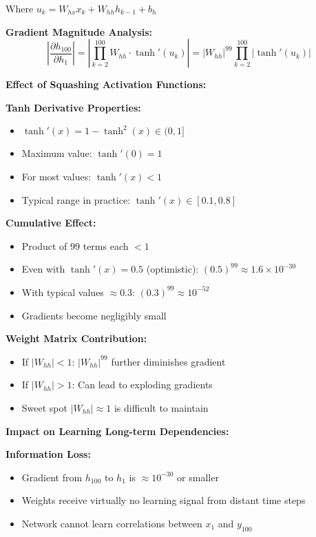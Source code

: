 \documentclass[12pt]{article}
\begin{document}
\begin{enumerate}[(a)]
{    Where $u_k = W_{hx} x_k + W_{hh} h_{k-1} + b_h$
    
    \textbf{Gradient Magnitude Analysis:}
    $$\left|\frac{\partial h_{100}}{\partial h_1}\right| = \left|\prod_{k=2}^{100} W_{hh} \cdot \tanh'(u_k)\right| = |W_{hh}|^{99} \prod_{k=2}^{100} |\tanh'(u_k)|$$
    
    \textbf{Effect of Squashing Activation Functions:}
    
    \textbf{Tanh Derivative Properties:}
    \begin{itemize}
        \item $\tanh'(x) = 1 - \tanh^2(x) \in (0, 1]$
        \item Maximum value: $\tanh'(0) = 1$
        \item For most values: $\tanh'(x) < 1$
        \item Typical range in practice: $\tanh'(x) \in [0.1, 0.8]$
    \end{itemize}
    
    \textbf{Cumulative Effect:}
    \begin{itemize}
        \item Product of 99 terms each $< 1$
        \item Even with $\tanh'(x) = 0.5$ (optimistic): $(0.5)^{99} \approx 1.6 \times 10^{-30}$
        \item With typical values $\approx 0.3$: $(0.3)^{99} \approx 10^{-52}$
        \item Gradients become negligibly small
    \end{itemize}
    
    \textbf{Weight Matrix Contribution:}
    \begin{itemize}
        \item If $|W_{hh}| < 1$: $|W_{hh}|^{99}$ further diminishes gradient
        \item If $|W_{hh}| > 1$: Can lead to exploding gradients
        \item Sweet spot $|W_{hh}| \approx 1$ is difficult to maintain
    \end{itemize}
    
    \textbf{Impact on Learning Long-term Dependencies:}
    
    \textbf{Information Loss:}
    \begin{itemize}
        \item Gradient from $h_{100}$ to $h_1$ is $\approx 10^{-30}$ or smaller
        \item Weights receive virtually no learning signal from distant time steps
        \item Network cannot learn correlations between $x_1$ and $y_{100}$
    \end{itemize}
    
}
\end{enumerate}
\end{document}

